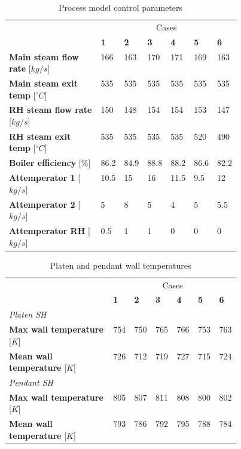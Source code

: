 \documentclass[review]{elsarticle}
\begin{document}
\begin{table}[h!]
\centering
\caption{Process model control parameters}
\label{fuel}
{\tabulinesep=1.2mm
\begin{tabularx}{\linewidth}{p{0.45\linewidth} XXXXXX}
\hline
&\multicolumn{6}{c}{Cases}\\
 & \textbf{1} & \textbf{2} & \textbf{3}& \textbf{4}&\textbf{5}&\textbf{6}\\
\hline
\textbf{Main steam flow rate} 	[$kg/s$]		&166&163&170	&171&169&163\\
\textbf{Main steam exit temp} 	[$^{\circ}C$]	&535&535&535	&535&535&535\\
\textbf{RH steam flow rate} 	[$kg/s$]		&150&148&154	&154&153&147\\
\textbf{RH steam exit temp} 	[$^{\circ}C$]	&535&535&535	&535&520&490\\
\textbf{Boiler efficiency} 		[$\%$]			&86.2&84.9&88.8	&88.2&86.6&82.2\\
\textbf{Attemperator 1} 		[$kg/s$]			&10.5&15&16		&11.5&9.5&12\\
\textbf{Attemperator 2} 		[$kg/s$]			&5&8&5			&4&5&5.5\\
\textbf{Attemperator RH} 		[$kg/s$]			&0.5&1&1		&0&0&0\\
\hline
\end{tabularx}}
\end{table}

\begin{table}[h!]
\centering
\caption{Platen and pendant wall temperatures}
\label{fuel}
{\tabulinesep=1.2mm
\begin{tabularx}{\linewidth}{p{0.45\linewidth} XXXXXX}
\hline
&\multicolumn{6}{c}{Cases}\\
 & \textbf{1} & \textbf{2} & \textbf{3}& \textbf{4}&\textbf{5}&\textbf{6}\\
\hline
\multicolumn{7}{l}{\textit{Platen SH}}\\
\textbf{Max wall temperature} [$K$]  &754 & 750 & 765 & 766 & 753 & 763\\
\textbf{Mean wall temperature} [$K$] &726 & 712 & 719 & 727 & 715 & 724\\
\multicolumn{7}{l}{\textit{Pendant SH}}\\
\textbf{Max wall temperature} [$K$]  & 805 & 807 & 811 & 808 & 800 & 802\\
\textbf{Mean wall temperature} [$K$] & 793 & 786 & 792 & 795 & 788 & 784\\
\hline
\end{tabularx}}
\end{table}
\end{document}

